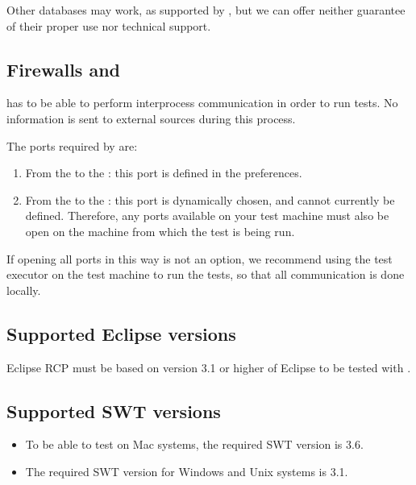 Other databases may work, as supported by , but we can offer neither guarantee of their proper use nor technical support. 

\subsection{Firewalls and \app{}}
\app{} has to be able to perform interprocess communication in order to run tests. No information is sent to external sources during this process. 

The ports required by \app{} are:
\begin{enumerate}
\item From the \ite{} to the \gdagent{}: this port is defined in the \app{}  preferences.
\item From the \gdaut{} to the \ite{}: this port is dynamically chosen, and cannot currently be defined. Therefore, any ports available on your test machine must also be open on the machine from which the test is being run.
\end{enumerate}

 If opening all ports in this way is not an option, we recommend using the \app{} test executor on the test machine to run the tests, so that all communication is done locally. 


\subsection{Supported Eclipse versions}
Eclipse RCP \gdauts{} must be based on version 3.1 or higher of Eclipse to be tested with \app{}. 

\subsection{Supported SWT versions}
\begin{itemize}
\item To be able to test \gdauts{} on Mac systems, the required SWT version is 3.6. 
\item The required SWT version for Windows and Unix systems is 3.1.
\end{itemize}
